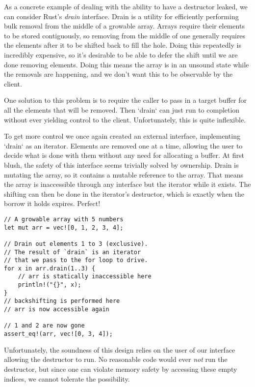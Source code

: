 As a concrete example of dealing with the ability to have a destructor leaked,
we can consider Rust's \emph{drain} interface. Drain is a
utility for efficiently performing bulk removal from the middle of a growable
array. Arrays require their elements to be stored contiguously, so removing
from the middle of one generally requires the elements after it to be
shifted back to fill the hole. Doing this repeatedly is incredibly expensive,
so it's desirable to be able to defer the shift until we are done removing
elements. Doing this means the array is in an unsound state while the
removals are happening, and we don't want this to be observable by the client.

One solution to this problem is to require the caller to pass in a
target buffer for all the elements that will be removed. Then `drain` can
just run to completion without ever yielding control to the client. Unfortunately,
this is quite inflexible.

To get more control we once again created an external interface, implementing
`drain` as an iterator. Elements are removed one at a time, allowing the user to
decide what is done with them without any need for allocating a buffer. At first
blush, the safety of this interface seems trivially solved by ownership. Drain is mutating the
array, so it contains a mutable reference to the array. That means the array is
inaccessible through any interface but the iterator while it exists. The
shifting can then be done in the iterator's destructor, which is exactly when
the borrow it holds expires. Perfect!

\begin{verbatim}
// A growable array with 5 numbers
let mut arr = vec![0, 1, 2, 3, 4];

// Drain out elements 1 to 3 (exclusive).
// The result of `drain` is an iterator
// that we pass to the for loop to drive.
for x in arr.drain(1..3) {
    // arr is statically inaccessible here
    println!("{}", x);
}
// backshifting is performed here
// arr is now accessible again

// 1 and 2 are now gone
assert_eq!(arr, vec![0, 3, 4]);
\end{verbatim}

Unfortunately, the soundness of this design relies on the user of our interface
allowing the destructor to run. No reasonable code would ever \emph{not} run the
destructor, but since one can violate memory safety by accessing these empty
indices, we cannot tolerate the possibility.

